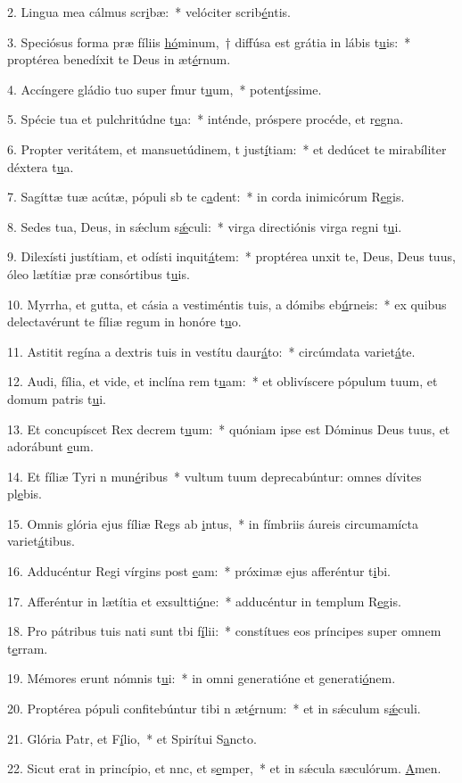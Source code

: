 2. Lingua mea cálmus scr\uline{i}bæ:~* velóciter scrib\uline{é}ntis.\par 
3. Speciósus forma præ fíliis \uline{hó}minum,~† diffúsa est grátia in lábis t\uline{u}is:~* proptérea benedíxit te Deus in æt\uline{é}rnum.\par 
4. Accíngere gládio tuo super fmur t\uline{u}um,~* potent\uline{í}ssime.\par 
5. Spécie tua et pulchritúdne t\uline{u}a:~* inténde, próspere procéde, et r\uline{e}gna.\par 
6. Propter veritátem, et mansuetúdinem, t just\uline{í}tiam:~* et dedúcet te mirabíliter déxtera t\uline{u}a.\par 
7. Sagíttæ tuæ acútæ, pópuli sb te c\uline{a}dent:~* in corda inimicórum R\uline{e}gis.\par 
8. Sedes tua, Deus, in sǽclum s\uline{ǽ}culi:~* virga directiónis virga regni t\uline{u}i.\par 
9. Dilexísti justítiam, et odísti inquit\uline{á}tem:~* proptérea unxit te, Deus, Deus tuus, óleo lætítiæ præ consórtibus t\uline{u}is.\par 
10. Myrrha, et gutta, et cásia a vestiméntis tuis, a dómibs eb\uline{ú}rneis:~* ex quibus delectavérunt te fíliæ regum in honóre t\uline{u}o.\par 
11. Astitit regína a dextris tuis in vestítu daur\uline{á}to:~* circúmdata variet\uline{á}te.\par 
12. Audi, fília, et vide, et inclína rem t\uline{u}am:~* et oblivíscere pópulum tuum, et domum patris t\uline{u}i.\par 
13. Et concupíscet Rex decrem t\uline{u}um:~* quóniam ipse est Dóminus Deus tuus, et adorábunt \uline{e}um.\par 
14. Et fíliæ Tyri n mun\uline{é}ribus~* vultum tuum deprecabúntur: omnes dívites pl\uline{e}bis.\par 
15. Omnis glória ejus fíliæ Regs ab \uline{i}ntus,~* in fímbriis áureis circumamícta variet\uline{á}tibus.\par 
16. Adducéntur Regi vírgins post \uline{e}am:~* próximæ ejus afferéntur t\uline{i}bi.\par 
17. Afferéntur in lætítia et exsultti\uline{ó}ne:~* adducéntur in templum R\uline{e}gis.\par 
18. Pro pátribus tuis nati sunt tbi f\uline{í}lii:~* constítues eos príncipes super omnem t\uline{e}rram.\par 
19. Mémores erunt nómnis t\uline{u}i:~* in omni generatióne et generati\uline{ó}nem.\par 
20. Proptérea pópuli confitebúntur tibi n æt\uline{é}rnum:~* et in sǽculum s\uline{ǽ}culi.\par 
21. Glória Patr, et F\uline{í}lio,~* et Spirítui S\uline{a}ncto.\par 
22. Sicut erat in princípio, et nnc, et s\uline{e}mper,~* et in sǽcula sæculórum. \uline{A}men.\par 
